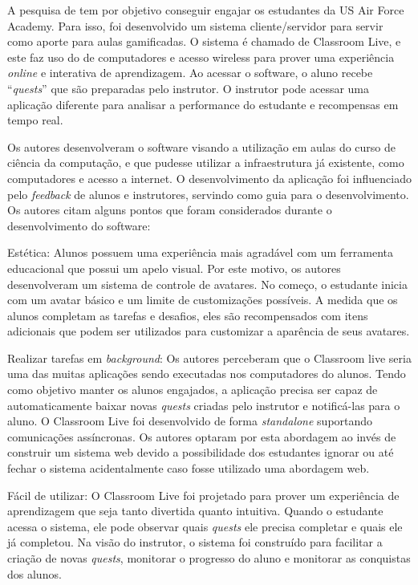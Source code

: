 \documentclass[
	12pt,				%
	oneside,			%
	a4paper,			%
	english,			%
	french,				%
	spanish,			%
	brazil,				%
	]{abntex2}
\begin{document}
A pesquisa de \citet{de2013classroom} tem por objetivo conseguir engajar os estudantes da US Air Force Academy. Para isso, foi desenvolvido um sistema cliente/servidor para servir como aporte para aulas gamificadas. O sistema é chamado de Classroom Live, e este faz uso do de computadores e acesso wireless para prover uma experiência \textit{online} e interativa de aprendizagem. Ao acessar o software, o aluno recebe “\textit{quests}” que são preparadas pelo instrutor. O instrutor pode acessar uma aplicação diferente para analisar a performance do estudante e recompensas em tempo real.

Os autores desenvolveram o software visando a utilização em aulas do curso de ciência da computação, e que pudesse utilizar a infraestrutura já existente, como computadores e acesso a internet. O desenvolvimento da aplicação foi influenciado pelo \textit{feedback} de alunos e instrutores, servindo como guia para o desenvolvimento. Os autores citam alguns pontos que foram considerados durante o desenvolvimento do software:

Estética: Alunos possuem uma experiência mais agradável com um ferramenta educacional que possui um apelo visual. Por este motivo, os autores desenvolveram um sistema de controle de avatares. No começo, o estudante inicia com um avatar básico e um limite de customizações possíveis. A medida que os alunos completam as tarefas e desafios, eles são recompensados com itens adicionais que podem ser utilizados para customizar a aparência de seus avatares.

Realizar tarefas em \textit{background}: Os autores perceberam que o Classroom live seria uma das muitas aplicações sendo executadas nos computadores do alunos. Tendo como objetivo manter os alunos engajados, a aplicação precisa ser capaz de automaticamente baixar novas \textit{quests} criadas pelo instrutor e notificá-las para o aluno. O Classroom Live foi desenvolvido de forma \textit{standalone} suportando comunicações assíncronas. Os autores optaram por esta abordagem ao invés de construir um sistema web devido a possibilidade dos estudantes ignorar ou até fechar o sistema acidentalmente caso fosse utilizado uma abordagem web.

Fácil de utilizar: O Classroom Live foi projetado para prover um experiência de aprendizagem que seja tanto divertida quanto intuitiva. Quando o estudante acessa o sistema, ele pode observar quais \textit{quests} ele precisa completar e quais ele já completou. Na visão do instrutor, o sistema foi construído para facilitar a criação de novas \textit{quests}, monitorar o progresso do aluno e monitorar as conquistas dos alunos.
\end{document}
